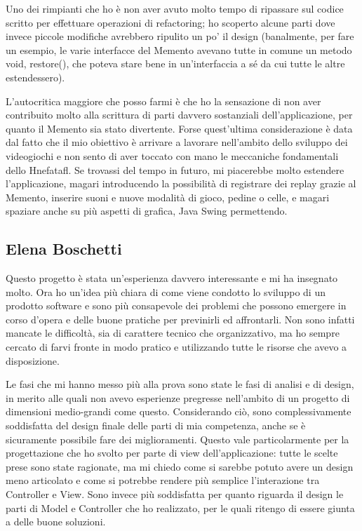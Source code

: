 \documentclass[a4paper,12pt]{report}
\begin{document}
Uno dei rimpianti che ho è non aver avuto molto tempo di ripassare sul codice scritto per effettuare operazioni di refactoring; ho scoperto alcune parti dove invece piccole modifiche avrebbero ripulito un po' il design (banalmente, per fare un esempio, le varie interfacce del Memento avevano tutte in comune un metodo void, restore(), che poteva stare bene in un'interfaccia a sé da cui tutte le altre estendessero). 

L'autocritica maggiore che posso farmi è che ho la sensazione di non aver contribuito molto alla scrittura di parti davvero sostanziali dell'applicazione, per quanto il Memento sia stato divertente. Forse quest'ultima considerazione è data dal fatto che il mio obiettivo è arrivare a lavorare nell'ambito dello sviluppo dei videogiochi e non sento di aver toccato con mano le meccaniche fondamentali dello Hnefatafl. Se trovassi del tempo in futuro, mi piacerebbe molto estendere l'applicazione, magari introducendo la possibilità di registrare dei replay grazie al Memento, inserire suoni e nuove modalità di gioco, pedine o celle, e magari spaziare anche su più aspetti di grafica, Java Swing permettendo.

\subsection{Elena Boschetti}

Questo progetto è stata un'esperienza davvero interessante e mi ha insegnato molto. Ora ho un'idea più chiara di come viene condotto lo sviluppo di un prodotto software e sono più consapevole dei problemi che possono emergere in corso d'opera e delle buone pratiche per previnirli ed affrontarli. Non sono infatti mancate le difficoltà, sia di carattere tecnico che organizzativo, ma ho sempre cercato di farvi fronte in modo pratico e utilizzando tutte le risorse che avevo a disposizione.

Le fasi che mi hanno messo più alla prova sono state le fasi di analisi e di design, in merito alle quali non avevo esperienze pregresse nell'ambito di un progetto di dimensioni medio-grandi come questo. Considerando ciò, sono complessivamente soddisfatta del design finale delle parti di mia competenza, anche se è sicuramente possibile fare dei miglioramenti. Questo vale particolarmente per la progettazione che ho svolto per parte di view dell'applicazione: tutte le scelte prese sono state ragionate, ma mi chiedo come si sarebbe potuto avere un design meno articolato e come si potrebbe rendere più semplice l'interazione tra Controller e View. Sono invece più soddisfatta per quanto riguarda il design le parti di Model e Controller che ho realizzato, per le quali ritengo di essere giunta a delle buone soluzioni.
\end{document}
